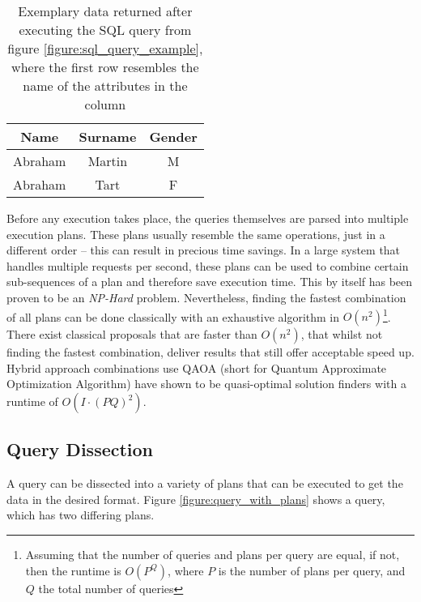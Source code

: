 \begin{table}[!h]
    \centering
    \begin{tabular}{|c|c|c|}
        \hline
        Name    & Surname & Gender \\ \hline
        Abraham & Martin  & M      \\ \hline
        Abraham & Tart    & F      \\ \hline
    \end{tabular}
    \caption{Exemplary data returned after executing the SQL query from figure \ref{figure:sql_query_example}, where the first row resembles the name of the attributes in the column}
    \label{table:sql_query_result_example}
\end{table}

Before any execution takes place, the queries themselves are parsed into multiple execution plans\cite{microsoft_execution_nodate}. These plans usually resemble the same operations, just in a different order – this can result in precious time savings. In a large system that handles multiple requests per second, these plans can be used to combine certain sub-sequences of a plan and therefore save execution time\cite{roy_multi-query_2009}. This by itself has been proven to be an \emph{NP-Hard} problem\cite{}. Nevertheless, finding the fastest combination of all plans can be done classically with an exhaustive algorithm in $O(n^2)$\footnote{Assuming that the number of queries and plans per query are equal, if not, then the runtime is $O(P^Q)$, where $P$ is the number of plans per query, and $Q$ the total number of queries}. There exist classical proposals that are faster than $O(n^2)$\cite{}, that whilst not finding the fastest combination, deliver results that still offer acceptable speed up. Hybrid approach combinations use QAOA (short for Quantum Approximate Optimization Algorithm)\cite{} have shown to be quasi-optimal solution finders with a runtime of $O(I \cdot (PQ)^2)$.\par

\subsection{Query Dissection}
A query can be dissected into a variety of plans that can be executed to get the data in the desired format. Figure \ref{figure:query_with_plans} shows a query, which has two differing plans.

